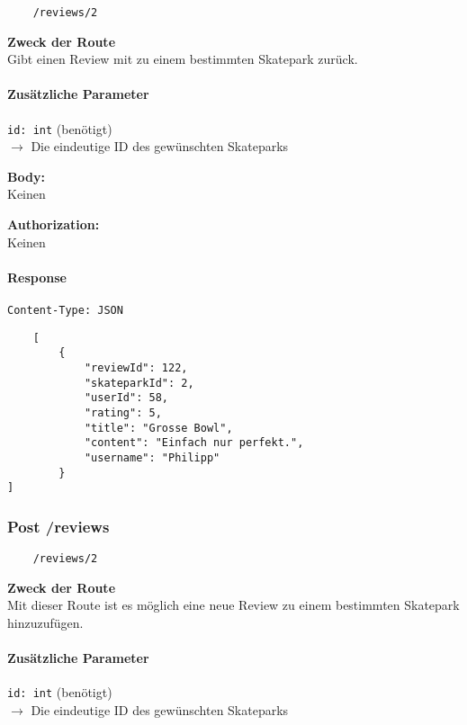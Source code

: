 \begin{lstlisting}
    /reviews/2
\end{lstlisting}

\textbf{Zweck der Route} \\
Gibt einen Review mit zu einem bestimmten Skatepark zurück.



\paragraph{Zusätzliche Parameter}
\lstinline{id: int} (benötigt) \\
$\rightarrow$ Die eindeutige ID des gewünschten Skateparks


\textbf{Body:} \\
Keinen

\textbf{Authorization:} \\
Keinen

\paragraph{Response }

\lstinline{Content-Type: JSON}
\begin{lstlisting}
    [
        {
            "reviewId": 122,
            "skateparkId": 2,
            "userId": 58,
            "rating": 5,
            "title": "Grosse Bowl",
            "content": "Einfach nur perfekt.",
            "username": "Philipp"
        }
]
\end{lstlisting}

\pagebreak


\subsubsection{Post /reviews}

\begin{lstlisting}
    /reviews/2
\end{lstlisting}

\textbf{Zweck der Route} \\
Mit dieser Route ist es möglich eine neue Review zu einem bestimmten Skatepark hinzuzufügen.




\paragraph{Zusätzliche Parameter}
\lstinline{id: int} (benötigt) \\
$\rightarrow$ Die eindeutige ID des gewünschten Skateparks


